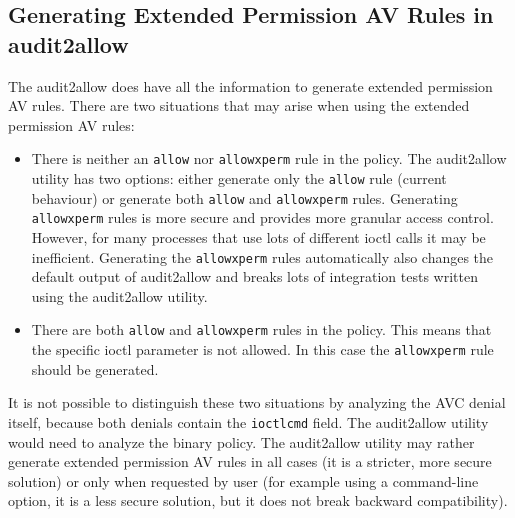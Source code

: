 \subsection{Generating Extended Permission AV Rules in audit2allow}
The audit2allow does have all the information to generate extended permission AV
rules. There are two situations that may arise when using the extended
permission AV rules:
\begin{itemize}
    \item There is neither an \texttt{allow} nor \texttt{allowxperm} rule in the
        policy. The audit2allow utility has two options: either generate only
        the \texttt{allow} rule (current behaviour) or generate both
        \texttt{allow} and \texttt{allowxperm} rules. Generating
        \texttt{allowxperm} rules is more secure and provides more granular
        access control. However, for many processes that use lots of different
        ioctl calls it may be inefficient.  Generating the \texttt{allowxperm}
        rules automatically also changes the default output of audit2allow and
        breaks lots of integration tests written using the audit2allow utility.
    \item There are both \texttt{allow} and \texttt{allowxperm} rules in the
        policy. This means that the specific ioctl parameter is not allowed. In
        this case the \texttt{allowxperm} rule should be generated.
\end{itemize}

It is not possible to distinguish these two situations by analyzing the AVC
denial itself, because both denials contain the \texttt{ioctlcmd} field. The
audit2allow utility would need to analyze the binary policy. The audit2allow
utility may rather generate extended permission AV rules in all cases (it is a
stricter, more secure solution) or only when requested by user (for example
using a command-line option, it is a less secure solution, but it does not break
backward compatibility).

